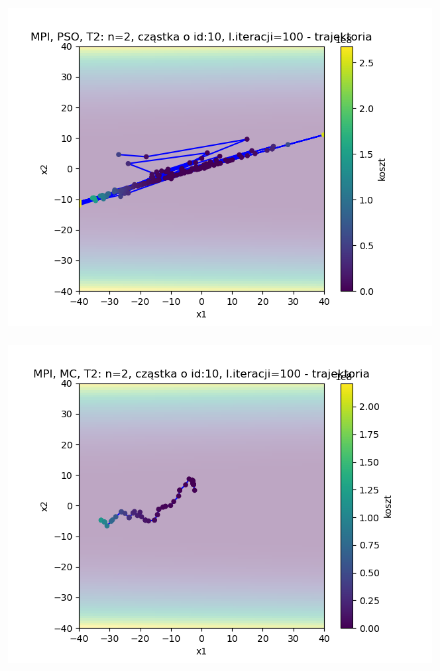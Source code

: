 \documentclass[11pt, a4paper, oneside]{article}
\begin{document}
\begin{figure}[H]
\centering
\begin{minipage}[b]{\dimexpr.5\textwidth-1em}
  \centering
  \includegraphics[width=1\linewidth]{grafiki/MPI_PSO_T2/MPI_ PSO_T2_trajectory_id10.png}
  \label{fig:trajektoriaWybrana:PSO2}
\end{minipage} \hfill
\begin{minipage}[b]{\dimexpr.5\textwidth-1em}
  \centering
  \includegraphics[width=1\linewidth]{grafiki/MPI_MC_T2/MPI_ MC_T2_trajectory_id10.png}
  \label{fig:trajektoriaWybrana:MC2}
\end{minipage}
\end{figure}
\end{document}
